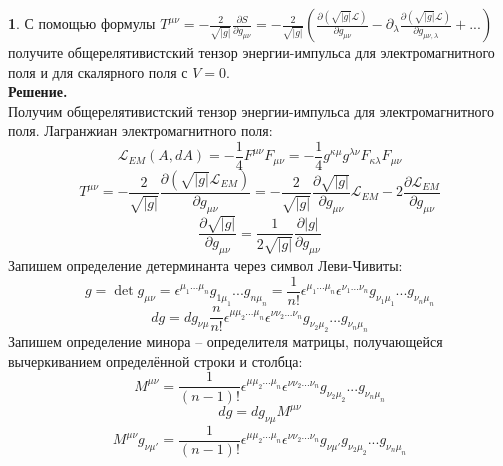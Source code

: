 \documentclass[12pt]{article}
\theoremstyle{definition}
\newtheorem{zad}{}[section]
\begin{document}
\begin{zad}
С помощью формулы $T^{\mu\nu}=-\frac{2}{\sqrt{|g|}}\frac{\partial S}{\partial g_{\mu\nu}}=-\frac{2}{\sqrt{|g|}}\left(\frac{\partial(\sqrt{|g|}\mathcal{L})}{\partial g_{\mu\nu}}-\partial_\lambda\frac{\partial(\sqrt{|g|}\mathcal{L})}{\partial g_{\mu\nu,\lambda}}+...\right)$ получите общерелятивистский тензор энергии-импульса для электромагнитного поля и для скалярного поля с $V = 0$.\\
\textbf{Решение.}\\
Получим общерелятивистский тензор энергии-импульса для электромагнитного поля. Лагранжиан электромагнитного поля:
\begin{equation}
    \mathcal{L}_{EM}(A,dA)=-\frac{1}{4}F^{\mu\nu}F_{\mu\nu}=-\frac{1}{4}g^{\kappa\mu}g^{\lambda\nu}F_{\kappa\lambda}F_{\mu\nu}
\end{equation}
\begin{equation}
    T^{\mu\nu}=-\frac{2}{\sqrt{|g|}}\frac{\partial(\sqrt{|g|}\mathcal{L}_{EM})}{\partial g_{\mu\nu}}=-\frac{2}{\sqrt{|g|}}\frac{\partial\sqrt{|g|}}{\partial g_{\mu\nu}}\mathcal{L}_{EM}-2\frac{\partial\mathcal{L}_{EM}}{\partial g_{\mu\nu}}
\end{equation}
\begin{equation}
    \frac{\partial\sqrt{|g|}}{\partial g_{\mu\nu}}=\frac{1}{2\sqrt{|g|}}\frac{\partial|g|}{\partial g_{\mu\nu}}
\end{equation}
Запишем определение детерминанта через символ Леви-Чивиты:
\begin{equation}
    g=\det g_{\mu\nu}=\epsilon^{\mu_1...\mu_n}g_{1\mu_1}...g_{n\mu_n}=\frac{1}{n!}\epsilon^{\mu_1...\mu_n}\epsilon^{\nu_1...\nu_n}g_{\nu_1\mu_1}...g_{\nu_n\mu_n}
\end{equation}
\begin{equation}
    dg=dg_{\nu\mu}\frac{n}{n!}\epsilon^{\mu\mu_2...\mu_n}\epsilon^{\nu\nu_2...\nu_n}g_{\nu_2\mu_2}...g_{\nu_n\mu_n}
\end{equation}
Запишем определение минора -- определителя матрицы, получающейся вычеркиванием определённой строки и столбца:
\begin{equation}
    M^{\mu\nu}=\frac{1}{(n-1)!}\epsilon^{\mu\mu_2...\mu_n}\epsilon^{\nu\nu_2...\nu_n}g_{\nu_2\mu_2}...g_{\nu_n\mu_n}
\end{equation}
\begin{equation}
    dg=dg_{\nu\mu}M^{\mu\nu}
\end{equation}
\begin{equation}
     M^{\mu\nu}g_{\nu\mu'}=\frac{1}{(n-1)!}\epsilon^{\mu\mu_2...\mu_n}\epsilon^{\nu\nu_2...\nu_n}g_{\nu\mu'}g_{\nu_2\mu_2}...g_{\nu_n\mu_n}

\end{equation}
\end{zad}
\end{document}
